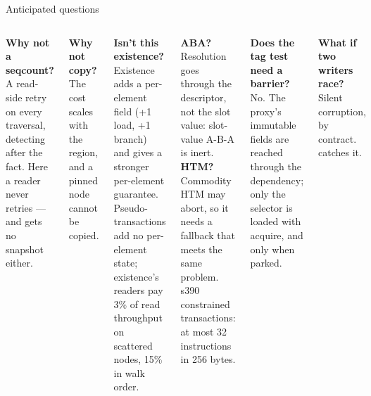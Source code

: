 \documentclass[aspectratio=169, 10pt, t, xcolor=table]{beamer}
\begin{document}
\begin{frame}{Anticipated questions}
\footnotesize
\begin{columns}[T, onlytextwidth]
  \textbf{Why not a seqcount?}\\
  A read-side retry on every traversal, detecting after the fact. Here a
  reader never retries --- and gets no snapshot either.
  \vspace{0.8mm}

  \textbf{Why not copy?}\\
  The cost scales with the region, and a pinned node cannot be copied.
  \vspace{0.8mm}

  \textbf{Isn't this existence?}\\
  Existence adds a per-element field (+1 load, +1 branch) and gives a
  stronger per-element guarantee. Pseudo-transactions add no per-element
  state; existence's readers pay 3\% of read throughput on scattered nodes,
  15\% in walk order.
  \vspace{0.8mm}

  \textbf{ABA?}\\
  Resolution goes through the descriptor, not the slot value: slot-value
  A-B-A is inert.
  \textbf{HTM?}\\
  Commodity HTM may abort, so it needs a fallback that meets the same problem.
  s390 constrained transactions: at most 32 instructions in 256 bytes.
  \vspace{0.8mm}


  \textbf{Does the tag test need a barrier?}\\
  No. The proxy's immutable fields are reached through the dependency; only
  the selector is loaded with acquire, and only when parked.
  \vspace{0.8mm}

  \textbf{What if two writers race?}\\
  Silent corruption, by contract. 
  catches it.
  \vspace{0.8mm}


\end{columns}
\end{frame}
\end{document}

